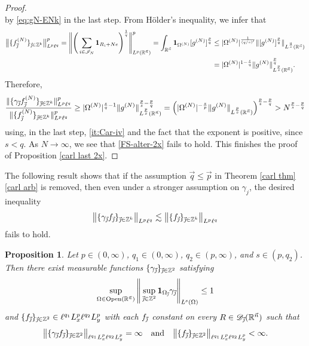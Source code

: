 \documentclass[11pt, reqno]{amsart}
\newtheorem{proposition}[theorem]{Proposition}
\theoremstyle{definition}
\theoremstyle{remark}
\numberwithin{equation}{section}
\newcommand{\D}{\mathscr D}
\newcommand{\R}{\mathbb R}
\newcommand{\vj}{\vec{\textit{\j}}}
\newcommand{\vn}{\vec n}
\newcommand{\vp}{\vec p}
\newcommand{\vq}{\vec q}
\newcommand{\one}{\mathbf{1}}
\newcommand{\aveL}{\textit{\L}}
\newcommand{\abs}[1]{|#1|}
\newcommand{\Norm}[2]{\|#1\|_{#2}}
\newcommand{\bNorm}[2]{\big\|#1\big\|_{#2}}
\newcommand{\Open}{\mathrm{Open}}
\begin{document}
\begin{proof}
\begin{equation*}
\end{equation*}
by \eqref{eq:gN-ENk} in the last step.
From H\"older's inequality, we infer that
\begin{equation*}
\begin{split}
\bNorm{\{ f_{\vj}^{(N)}\}_{\vj\in\mathbb Z^k}}{L^p\ell^q}^p
=\Bigg\| \Bigg(\sum_{i\in \mathscr I_N} \mathbf 1_{R_i+Ne}\Bigg)^{\frac1q} \Bigg\|_{L^p(\mathbb R^{\vec n})}^p
= \int_{\mathbb R^{\vec n}} \mathbf 1_{\Omega^{(N)}}
[g^{(N)}]^{\frac pq}
&\leq |\Omega^{(N)}|^{\frac1{(q/s)'}} \Norm{[g^{(N)}]^{\frac pq}}{L^{\frac qs}(\R^{\vn})} \\
&= |\Omega^{(N)}|^{1-\frac sq} \Norm{g^{(N)}}{L^{\frac ps}(\R^{\vn})}^{\frac pq}.
\end{split}
\end{equation*}
Therefore,
\begin{equation*}
\frac{\|\{\gamma_{\vj}f_{\vj}^{(N)}\}_{\vj\in\mathbb Z^k}\|_{L^p\ell^q}^p}
{\|\{f_{\vj}^{(N)}\}_{\vj\in\mathbb Z^k}\|_{L^p\ell^q}^p}
\geq
\abs{\Omega^{(N)}}^{\frac sq-1}\Norm{g^{(N)}}{L^{\frac ps}(\R^{\vn})}^{\frac ps-\frac pq}
=
\Big(\abs{\Omega^{(N)}}^{-\frac sp}\Norm{g^{(N)}}{L^{\frac ps}(\R^{\vn})}
\Big)^{\frac ps-\frac pq}
>N^{\frac ps-\frac pq}
\end{equation*}
using, in the last step, \eqref{it:Car-iv} and the fact that the exponent is positive, since $s<q$.
As $N\to\infty$, we see that \eqref{FS-alter-2x} fails to hold.
This finishes the proof of Proposition \ref{carl last 2x}.
\end{proof}

The following result shows that if the assumption $\vq\leq\vp$ in Theorem \ref{carl thm}\eqref{carl arb} is removed,
then even under a stronger assumption on $\gamma_j$,
the desired inequality
\begin{equation*}
\bNorm{\{\gamma_{\vj}f_{\vj}\}_{\vj\in\mathbb Z^k}}{L^p\ell^q}
\lesssim \bNorm{\{ f_{\vj}\}_{\vj\in\mathbb Z^k}}{L^p\ell^q}
\end{equation*}
fails to hold.

\begin{proposition}\label{counterexample-gamma}
Let $p\in(0,\infty)$, $q_1\in(0,\infty)$, $q_2\in(p,\infty)$, and $s\in(p,q_2)$.
Then there exist measurable functions
$\{\gamma_{\vj}\}_{\vj\in\mathbb Z^2}$ satisfying
\begin{align}\label{supomega}
\sup_{\Omega\in\Open(\R^{\vn})}\Bigg\|\sup_{\vj\in\mathbb Z^2}
\one_{\Omega_{\vj}} \gamma_{\vj} \Bigg\|_{\aveL^s(\Omega)}\le1
\end{align}
and $\{f_{\vj}\}_{\vj\in\mathbb Z^2}\in \ell^{q_1}L_x^{p}\ell^{q_2}L_y^p$
with each $f_{\vj}$ constant on every $R\in\D_{\vj}(\R^{\vn})$ such that
\begin{equation}\label{counterexample4}
\bNorm{\{\gamma_{\vj}f_{\vj}\}_{\vj\in\mathbb Z^2}}{\ell^{q_1}L_x^{p}\ell^{q_2}L_y^p}=\infty
\quad\text{and}\quad
\bNorm{\{ f_{\vj}\}_{\vj\in\mathbb Z^2}}{\ell^{q_1}L_x^{p}\ell^{q_2}L_y^p}<\infty.
\end{equation}
\end{proposition}
\end{document}
